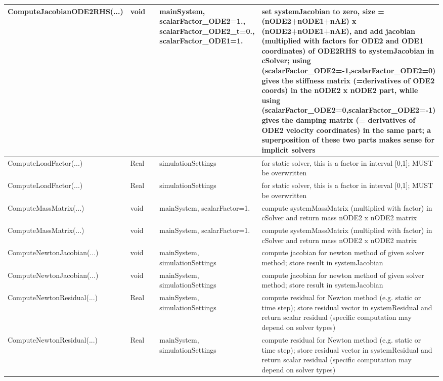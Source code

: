 \begin{center}
\begin{longtable}{| p{4.2cm} | p{2.5cm} | p{0.3cm} | p{3.0cm} | p{6cm} |}
    ComputeJacobianODE2RHS(...) &     void &      &     mainSystem, scalarFactor\_ODE2=1., scalarFactor\_ODE2\_t=0., scalarFactor\_ODE1=1. &     set systemJacobian to zero, size = (nODE2+nODE1+nAE) x (nODE2+nODE1+nAE), and add jacobian (multiplied with factors for ODE2 and ODE1 coordinates) of ODE2RHS to systemJacobian in cSolver; using (scalarFactor\_ODE2=-1,scalarFactor\_ODE2=0) gives the stiffness matrix (=derivatives of ODE2 coords) in the nODE2 x nODE2 part, while using (scalarFactor\_ODE2=0,scalarFactor\_ODE2=-1) gives the damping matrix (= derivatives of ODE2 velocity coordinates) in the same part; a superposition of these two parts makes sense for implicit solvers\\ \hline
    ComputeLoadFactor(...) &     Real &      &     simulationSettings &     for static solver, this is a factor in interval [0,1]; MUST be overwritten\\ \hline
    ComputeLoadFactor(...) &     Real &      &     simulationSettings &     for static solver, this is a factor in interval [0,1]; MUST be overwritten\\ \hline
    ComputeMassMatrix(...) &     void &      &     mainSystem, scalarFactor=1. &     compute systemMassMatrix (multiplied with factor) in cSolver and return mass nODE2 x nODE2 matrix\\ \hline
    ComputeMassMatrix(...) &     void &      &     mainSystem, scalarFactor=1. &     compute systemMassMatrix (multiplied with factor) in cSolver and return mass nODE2 x nODE2 matrix\\ \hline
    ComputeNewtonJacobian(...) &     void &      &     mainSystem, simulationSettings &     compute jacobian for newton method of given solver method; store result in systemJacobian\\ \hline
    ComputeNewtonJacobian(...) &     void &      &     mainSystem, simulationSettings &     compute jacobian for newton method of given solver method; store result in systemJacobian\\ \hline
    ComputeNewtonResidual(...) &     Real &      &     mainSystem, simulationSettings &     compute residual for Newton method (e.g. static or time step); store residual vector in systemResidual and return scalar residual (specific computation may depend on solver types)\\ \hline
    ComputeNewtonResidual(...) &     Real &      &     mainSystem, simulationSettings &     compute residual for Newton method (e.g. static or time step); store residual vector in systemResidual and return scalar residual (specific computation may depend on solver types)\\ \hline

\end{longtable}
\end{center}
